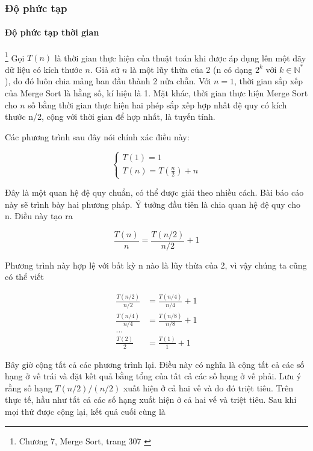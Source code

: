 \subsubsection{Độ phức tạp}
\paragraph{Độ phức tạp thời gian}\footnote{Chương 7, Merge Sort, trang 307 \cite{dsa-analysis-cpp}}
Gọi $T(n)$ là thời gian thực hiện của thuật toán khi được áp dụng lên một dãy dữ liệu có kích thước $n$.
Giả sử $n$ là một lũy thừa của 2 (n có dạng $2^k$ với $k \in \mathbb{N}^*$), do đó luôn chia mảng ban đầu thành 2 nửa chẵn. Với $n = 1$, thời gian sắp xếp của Merge Sort là hằng số, kí hiệu là 1. Mặt khác, thời gian thực hiện Merge Sort cho $n$ số bằng thời gian thực hiện hai phép sắp xếp hợp nhất đệ quy có kích thước n/2, cộng với thời gian để hợp nhất, là tuyến tính. 

Các phương trình sau đây nói chính xác điều này:

$$\left\{
\begin{array}{l}
        T(1) = 1 \\
        T(n) = T(\frac{n}{2}) + n
\end{array}
\right.$$

Đây là một quan hệ đệ quy chuẩn, có thể được giải theo nhiều cách. Bài báo cáo này sẽ trình bày hai phương pháp. Ý tưởng đầu tiên là chia quan hệ đệ quy cho n. Điều này tạo ra

$$\frac{T(n)}{n} = \frac{T(n / 2)}{n / 2} + 1$$

Phương trình này hợp lệ với bất kỳ n nào là lũy thừa của 2, vì vậy chúng ta cũng có thể viết 

\begin{align*}
    \frac{T(n/2)}{n/2} &= \frac{T(n / 4)}{n / 4} + 1 \\
    \frac{T(n/4)}{n/4} &= \frac{T(n / 8)}{n / 8} + 1 \\
    \dots \\
    \frac{T(2)}{2} &= \frac{T(1)}{1} + 1
\end{align*}

Bây giờ cộng tất cả các phương trình lại. Điều này có nghĩa là cộng tất cả các số hạng ở vế trái và đặt kết quả bằng tổng của tất cả các số hạng ở vế phải. Lưu ý rằng số hạng $T(n/2)/(n/2)$ xuất hiện ở cả hai vế và do đó triệt tiêu. Trên thực tế, hầu như tất cả các số hạng xuất hiện ở cả hai vế và triệt tiêu. Sau khi mọi thứ được cộng lại, kết quả cuối cùng là 

